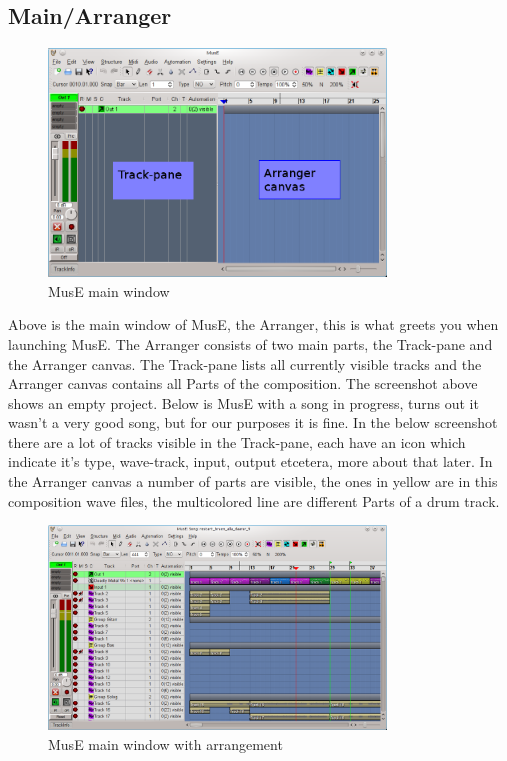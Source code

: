 \documentclass[a4paper]{report}
\newcommand{\screenshotwidth}[0]{0.8\textwidth}
\begin{document}
\subsection{Main/Arranger}

\label{Main/Arranger} 
\begin{figure}[htp]
\centering \includegraphics[width=\screenshotwidth]
{pics/main_window_annotated} 
\caption{MusE main window}
\label{fig:Main Window} 
\end{figure}
Above is the main window of MusE, the Arranger, this is what greets you
when launching MusE. The Arranger consists of two main parts, the Track-pane
and the Arranger canvas. The Track-pane lists all currently visible tracks
and the Arranger canvas contains all Parts of the composition. The
screenshot above shows an empty project. Below is MusE with a song in
progress, turns out it wasn't a very good song, but for our purposes it
is fine. In the below screenshot there are a lot of tracks visible in the
Track-pane, each have an icon which indicate it's type, wave-track, input,
output etcetera, more about that later. In the Arranger canvas a number of
parts are visible, the ones in yellow are in this composition wave files,
the multicolored line are different Parts of a drum track.
\label{Main/Arranger} 
\begin{figure}[htp]
\centering \includegraphics[width=\screenshotwidth]
{pics/main_window_with_arrangement} 
\caption{MusE main window with arrangement}
\label{fig:Main Window with arrangement} 
\end{figure}
\end{document}
